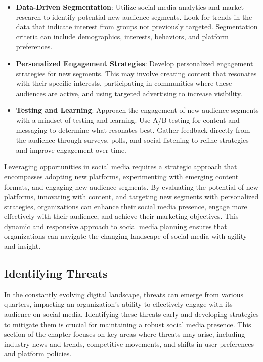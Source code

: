 \documentclass[
]{book}
\providecommand{\tightlist}{%
  \setlength{\itemsep}{0pt}\setlength{\parskip}{0pt}}
\begin{document}
\begin{itemize}
\tightlist
\item
  \textbf{Data-Driven Segmentation}: Utilize social media analytics and market research to identify potential new audience segments. Look for trends in the data that indicate interest from groups not previously targeted. Segmentation criteria can include demographics, interests, behaviors, and platform preferences.
\item
  \textbf{Personalized Engagement Strategies}: Develop personalized engagement strategies for new segments. This may involve creating content that resonates with their specific interests, participating in communities where these audiences are active, and using targeted advertising to increase visibility.
\item
  \textbf{Testing and Learning}: Approach the engagement of new audience segments with a mindset of testing and learning. Use A/B testing for content and messaging to determine what resonates best. Gather feedback directly from the audience through surveys, polls, and social listening to refine strategies and improve engagement over time.
\end{itemize}

Leveraging opportunities in social media requires a strategic approach that encompasses adopting new platforms, experimenting with emerging content formats, and engaging new audience segments. By evaluating the potential of new platforms, innovating with content, and targeting new segments with personalized strategies, organizations can enhance their social media presence, engage more effectively with their audience, and achieve their marketing objectives. This dynamic and responsive approach to social media planning ensures that organizations can navigate the changing landscape of social media with agility and insight.

\hypertarget{identifying-threats}{%
\subsection*{Identifying Threats}\label{identifying-threats}}

In the constantly evolving digital landscape, threats can emerge from various quarters, impacting an organization's ability to effectively engage with its audience on social media. Identifying these threats early and developing strategies to mitigate them is crucial for maintaining a robust social media presence. This section of the chapter focuses on key areas where threats may arise, including industry news and trends, competitive movements, and shifts in user preferences and platform policies.
\end{document}
